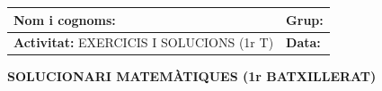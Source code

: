 \documentclass[12pt,a4paper]{article}
\begin{document}
\begingroup
\renewcommand{\arraystretch}{2.2}
\begin{tabularx}{\textwidth}{|X|p{4cm}|}
    \hline
    \textbf{Nom i cognoms:} & \textbf{Grup:} \\ \hline
    \textbf{Activitat:} EXERCICIS I SOLUCIONS (1r T) & \textbf{Data:} \\ \hline
\end{tabularx}
\endgroup

\vspace{0.8cm}

\begin{center}
    {\Large \textbf{SOLUCIONARI MATEMÀTIQUES (1r BATXILLERAT)}}
\end{center}

\vspace{0.5cm}
\end{document}
